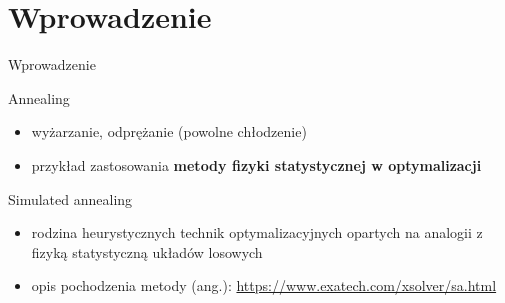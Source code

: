\section{Wprowadzenie}
	\begin{frame}{Wprowadzenie}
		\begin{block}{Annealing}
			\begin{itemize}
				\item wyżarzanie, odprężanie (powolne chłodzenie)	
				\item przykład zastosowania \textbf{metody fizyki statystycznej w optymalizacji} \cite{kirkpatrick}
			\end{itemize}
		\end{block}
	
		\begin{block}{Simulated annealing}
			\begin{itemize}
				\item rodzina heurystycznych technik optymalizacyjnych opartych na analogii z fizyką statystyczną układów losowych 
				\item opis pochodzenia metody (ang.): \url{https://www.exatech.com/xsolver/sa.html}					
			\end{itemize}
		\end{block}	
	\end{frame}